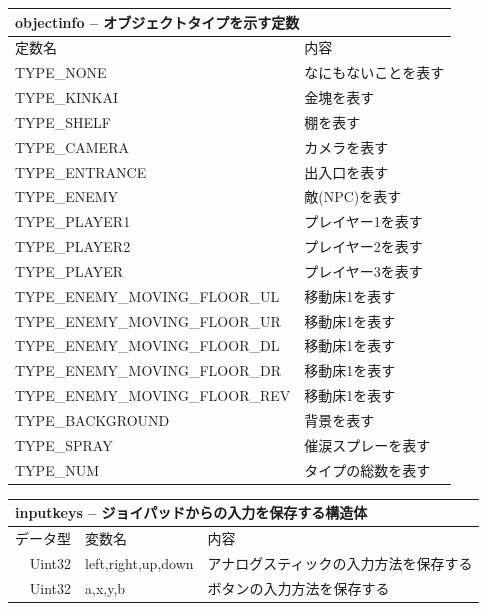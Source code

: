 \documentclass{jarticle}
\begin{document}
\begin{table}[H]
\begin{tabular}{|l|l|}
\hline
  \multicolumn{2}{|l|}{objectinfo -- オブジェクトタイプを示す定数 }\\ \hline
定数名    & 内容        \\ \hline
  TYPE\_NONE & なにもないことを表す \\
  TYPE\_KINKAI & 金塊を表す \\
  TYPE\_SHELF & 棚を表す \\
  TYPE\_CAMERA & カメラを表す \\
  TYPE\_ENTRANCE & 出入口を表す \\
  TYPE\_ENEMY & 敵(NPC)を表す  \\
  TYPE\_PLAYER1& プレイヤー1を表す \\
  TYPE\_PLAYER2 &プレイヤー2を表す \\
  TYPE\_PLAYER&プレイヤー3を表す \\
  TYPE\_ENEMY\_MOVING\_FLOOR\_UL & 移動床1を表す  \\
  TYPE\_ENEMY\_MOVING\_FLOOR\_UR &移動床1を表す  \\
  TYPE\_ENEMY\_MOVING\_FLOOR\_DL &移動床1を表す  \\
  TYPE\_ENEMY\_MOVING\_FLOOR\_DR &移動床1を表す  \\
  TYPE\_ENEMY\_MOVING\_FLOOR\_REV &移動床1を表す  \\
  TYPE\_BACKGROUND & 背景を表す \\
  TYPE\_SPRAY & 催涙スプレーを表す \\
  TYPE\_NUM& タイプの総数を表す \\ \hline
\end{tabular}
\end{table}


\begin{table}[H]
\begin{tabular}{|r|l|l|}
\hline
\multicolumn{3}{|l|}{inputkeys -- ジョイパッドからの入力を保存する構造体}       \\ \hline
データ型      & 変数名    & 内容        \\ \hline
Uint32    & left,right,up,down & アナログスティックの入力方法を保存する \\
Uint32    & a,x,y,b & ボタンの入力方法を保存する \\ \hline
\end{tabular}
\end{table}
\end{document}
